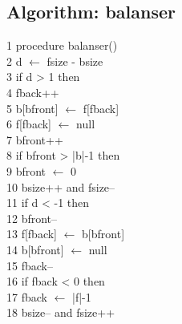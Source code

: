 \documentclass{article}%
\newcommand{\æ}{\textunderscore}
\newcommand{\å}{\iosevka}
\begin{document}
\begin{center}
    \begin{minipage}[t]{.48\linewidth}
        \subsection*{Algorithm: balanser} 
        \iosevka
        \color{darkgray}
        1 procedure balanser() \\
        2\hspace*{6mm} d $\leftarrow$ f\æ size - b\æ size\\
        3\hspace*{6mm} if d > 1 then\\
        4\hspace*{12mm} f\æ back++\\
        5\hspace*{12mm} b[b\æ front] $\leftarrow$ f[f\æ back]\\
        6\hspace*{12mm} f[f\æ back] $\leftarrow$ null\\
        7\hspace*{12mm} b\æ front++\\
        8\hspace*{12mm} if b\æ front > |b|-1 then\\
        9\hspace*{18mm} b\æ front $\leftarrow$ 0\\
        10\hspace*{10mm} b\æ size++ and f\æ size--\\
        11\hspace*{4mm} if d < -1 then\\
        12\hspace*{10mm} b\æ front-- \\
        13\hspace*{10mm} f[f\æ back] $\leftarrow$ b[b\æ front]\\
        14\hspace*{10mm} b[b\æ front] $\leftarrow$ null\\
        15\hspace*{10mm} f\æ back--\\
        16\hspace*{10mm} if f\æ back < 0 then \\
        17\hspace*{16mm} f\æ back $\leftarrow$ |f|-1 \\
        18\hspace*{10mm} b\æ size-- and f\æ size++\\
    \end{minipage}
\end{center}
%
%
\end{document}
